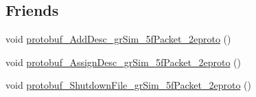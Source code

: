 \subsection*{Friends}
\begin{DoxyCompactItemize}
\item 
void \hyperlink{classgr_sim___packet_acdb4c3d5c9e85db3a3c1c00d12185091}{protobuf\-\_\-\-Add\-Desc\-\_\-gr\-Sim\-\_\-5f\-Packet\-\_\-2eproto} ()
\item 
void \hyperlink{classgr_sim___packet_afbb4eb3b543b41277ead21bd9980240a}{protobuf\-\_\-\-Assign\-Desc\-\_\-gr\-Sim\-\_\-5f\-Packet\-\_\-2eproto} ()
\item 
void \hyperlink{classgr_sim___packet_afc05d3295923295946b66245d015ef77}{protobuf\-\_\-\-Shutdown\-File\-\_\-gr\-Sim\-\_\-5f\-Packet\-\_\-2eproto} ()
\end{DoxyCompactItemize}


